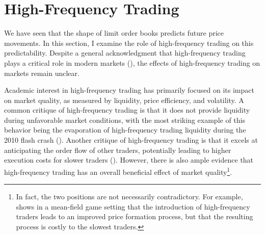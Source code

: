 \section{High-Frequency Trading}
	We have seen that the shape of limit order books predicts future price movements. In this section, I examine the role of high-frequency trading on this predictability. Despite a general acknowledgment that high-frequency trading plays a critical role in modern markets (\citet{OHara2015}), the effects of high-frequency trading on markets remain unclear.

	Academic interest in high-frequency trading has primarily focused on its impact on market quality, as measured by liquidity, price efficiency, and volatility. A common critique of high-frequency trading is that it does not provide liquidity during unfavorable market conditions, with the most striking example of this behavior being the evaporation of high-frequency trading liquidity during the 2010 flash crash (\citet{Kirilenko2015}). Another critique of high-frequency trading is that it excels at anticipating the order flow of other traders, potentially leading to higher execution costs for slower traders (\citet{Hirschey2013}). However, there is also ample evidence that high-frequency trading has an overall beneficial effect of market quality\footnote{In fact, the two positions are not necessarily contradictory. For example, \citet{Lachapelle2013} shows in a mean-field game setting that the introduction of high-frequency traders leads to an improved price formation process, but that the resulting process is costly to the slowest traders.}.

